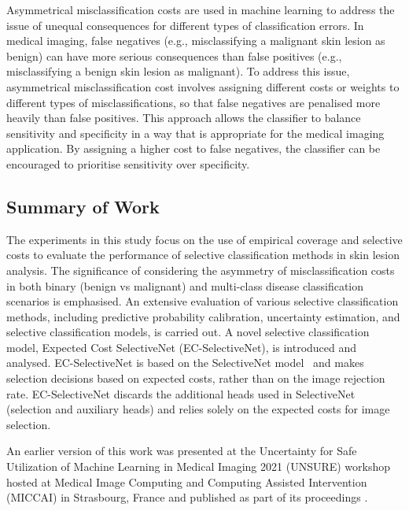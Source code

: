 Asymmetrical misclassification costs are used in machine learning to address the issue of unequal consequences for different types of classification errors. In medical imaging, false negatives (e.g., misclassifying a malignant skin lesion as benign) can have more serious consequences than false positives (e.g., misclassifying a benign skin lesion as malignant). To address this issue, asymmetrical misclassification cost involves assigning different costs or weights to different types of misclassifications, so that false negatives are penalised more heavily than false positives. This approach allows the classifier to balance sensitivity and specificity in a way that is appropriate for the medical imaging application. By assigning a higher cost to false negatives, the classifier can be encouraged to prioritise sensitivity over specificity.

\subsection{Summary of Work}
\label{subsec:selective_summary_of_work}
The experiments in this study focus on the use of empirical coverage and selective costs to evaluate the performance of selective classification methods in skin lesion analysis. The significance of considering the asymmetry of misclassification costs in both binary (benign vs malignant) and multi-class disease classification scenarios is emphasised. An extensive evaluation of various selective classification methods, including predictive probability calibration, uncertainty estimation, and selective classification models, is carried out. A novel selective classification model, Expected Cost SelectiveNet (EC-SelectiveNet), is introduced and analysed. EC-SelectiveNet is based on the SelectiveNet model~\citep{geifman2019selectivenet} and makes selection decisions based on expected costs, rather than on the image rejection rate. EC-SelectiveNet discards the additional heads used in SelectiveNet (selection and auxiliary heads) and relies solely on the expected costs for image selection.

An earlier version of this work was presented at the Uncertainty for Safe Utilization of Machine Learning in Medical Imaging 2021 (UNSURE) workshop hosted at Medical Image Computing and Computing Assisted Intervention (MICCAI) in Strasbourg, France and published as part of its proceedings \citep{carse2021robust}.



